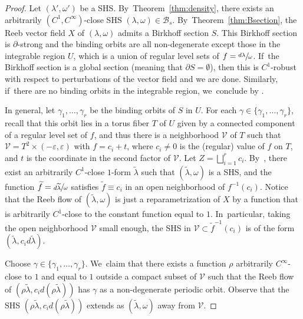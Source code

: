 \documentclass[10pt]{amsart}
\theoremstyle{definition}
\begin{document}
\begin{proof}
Let $(\lambda',\omega')$ be a SHS. By~Theorem~\ref{thm:density}, there exists an arbitrarily $(C^1,C^\infty)$-close SHS $(\lambda,\omega) \in \mathcal{B}_s$. By~Theorem~\ref{thm:Bsection}, the Reeb vector field $X$ of $(\lambda,\omega)$ admits a Birkhoff section $S$. This Birkhoff section is $\partial$-strong and the binding orbits are all non-degenerate except those in the integrable region $U$, which is a union of regular level sets of $f=\sfrac{d\lambda}{\omega}$. If~the Birkhoff section is a global section (meaning that $\partial S=\emptyset$), then this is $C^1$-robust with respect to perturbations of the vector field and we are done. Similarly, if~there are no binding orbits in the integrable region, we~conclude by \cite[\S 5]{CDHR}.

In general, let $\gamma_1,\dots, \gamma_r$ be the binding orbits of $S$ in $U$. For each $\gamma\in \{\gamma_1,\dots, \gamma_r\}$, recall that this orbit lies in a torus fiber $T$ of $U$ given by a connected component of a regular level set of $f$, and thus there is a neighborhood $\mathcal{V}$ of $T$ such that $\mathcal{V}=T^2\times (-\varepsilon,\varepsilon)$ with $f=c_i+t$, where $c_i\neq 0$ is the (regular) value of $f$ on $T$, and $t$ is the coordinate in the second factor of $\mathcal{V}$. Let $Z=\bigsqcup_{i=1}^r c_i$. By~\cite[Prop.\,3.23]{CV1}, there exist an arbitrarily $C^1$-close $1$-form $\widetilde \lambda$ such that $(\widetilde \lambda, \omega)$ is a SHS, and the function $\widetilde f=\sfrac{d\widetilde \lambda}{\omega}$ satisfies $\widetilde f\equiv c_i$ in an open neighborhood of $f^{-1}(c_i)$. Notice that the Reeb flow of $(\widetilde \lambda, \omega)$ is just a reparametrization of $X$ by a function that is arbitrarily $C^1$-close to the constant function equal to $1$. In~particular, taking the open neighborhood $\mathcal{V}$ small enough, the SHS in $\mathcal{V}\subset \widetilde f^{-1}(c_i)$ is of the form $(\widetilde \lambda, c_i d\widetilde \lambda)$.\enlargethispage{.5\baselineskip}%

Choose $\gamma \in \{\gamma_1,\ldots, \gamma_r\}$. We~claim that there exists a function $\rho$ arbitrarily $C^\infty$\nobreakdash-close to $1$ and equal to $1$ outside a compact subset of $\mathcal V$ such that the Reeb flow of $(\rho\widetilde \lambda, c_i d (\rho \widetilde \lambda))$ has $\gamma$ as a non-degenerate periodic orbit. Observe that the SHS $(\rho\widetilde \lambda, c_i d (\rho \widetilde \lambda))$ extends as $(\widetilde \lambda, \omega)$ away from $\mathcal V$.


\end{proof}
\end{document}
